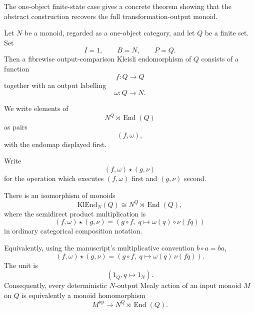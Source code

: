 The one-object finite-state case gives a concrete theorem showing that the abstract construction
recovers the full transformation-output monoid.

Let \(N\) be a monoid, regarded as a one-object category, and let \(Q\) be a finite set.  Set
\[
        I=1,
        \qquad
        B=N,
        \qquad
        P=Q.
\]
Then a fibrewise output-comparison Kleisli endomorphism of \(Q\) consists of a function
\[
        f:Q\to Q
\]
together with an output labelling
\[
        \omega:Q\to N.
\]

We write elements of
\[
        N^Q\rtimes\operatorname{End}(Q)
\]
as pairs
\[
        (f,\omega),
\]
with the endomap displayed first.

Write
\[
        (f,\omega)\star(g,\nu)
\]
for the operation which executes \((f,\omega)\) first and \((g,\nu)\) second.

\begin{theorem}
\label{thm:finite-mealy-cayley}
There is an isomorphism of monoids
\[
        \mathrm{KlEnd}_N(Q)
        \cong
        N^Q\rtimes \operatorname{End}(Q),
\]
where the semidirect product multiplication is
\[
        (f,\omega)\star(g,\nu)
        =
        \left(g\circ f,\;q\mapsto \omega(q)\circ\nu(fq)\right)
\]
in ordinary categorical composition notation.

Equivalently, using the manuscript's multiplicative convention \(b\circ a=ba\),
\[
        (f,\omega)\star(g,\nu)
        =
        \left(g\circ f,\;q\mapsto \omega(q)\,\nu(fq)\right).
\]
The unit is
\[
        (1_Q,q\mapsto 1_N).
\]
Consequently, every deterministic \(N\)-output Mealy action of an input monoid \(M\) on \(Q\) is
equivalently a monoid homomorphism
\[
        M^{\operatorname{op}}
        \longrightarrow
        N^Q\rtimes\operatorname{End}(Q).
\]
\end{theorem}

